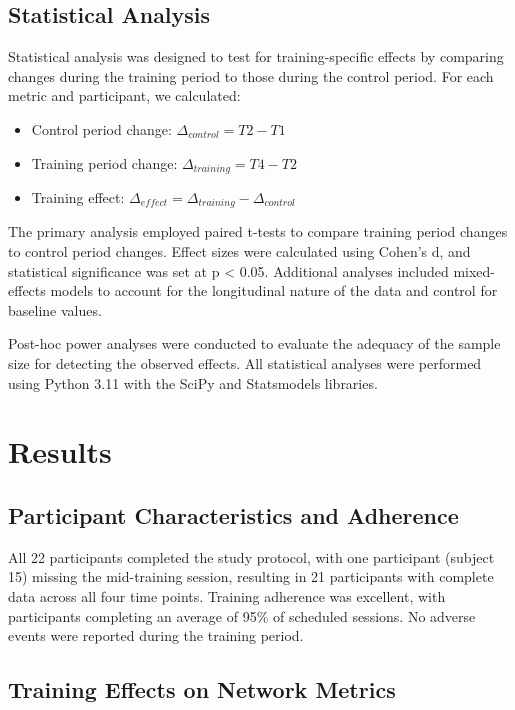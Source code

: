 \documentclass[12pt,a4paper]{article}
\begin{document}
\subsection{Statistical Analysis}

Statistical analysis was designed to test for training-specific effects by comparing changes during the training period to those during the control period. For each metric and participant, we calculated:
\begin{itemize}
    \item Control period change: $\Delta_{control} = T2 - T1$
    \item Training period change: $\Delta_{training} = T4 - T2$
    \item Training effect: $\Delta_{effect} = \Delta_{training} - \Delta_{control}$
\end{itemize}

The primary analysis employed paired t-tests to compare training period changes to control period changes. Effect sizes were calculated using Cohen's d, and statistical significance was set at p < 0.05. Additional analyses included mixed-effects models to account for the longitudinal nature of the data and control for baseline values.

Post-hoc power analyses were conducted to evaluate the adequacy of the sample size for detecting the observed effects. All statistical analyses were performed using Python 3.11 with the SciPy and Statsmodels libraries.

\section{Results}

\subsection{Participant Characteristics and Adherence}

All 22 participants completed the study protocol, with one participant (subject 15) missing the mid-training session, resulting in 21 participants with complete data across all four time points. Training adherence was excellent, with participants completing an average of 95\% of scheduled sessions. No adverse events were reported during the training period.

\subsection{Training Effects on Network Metrics}
\end{document}
